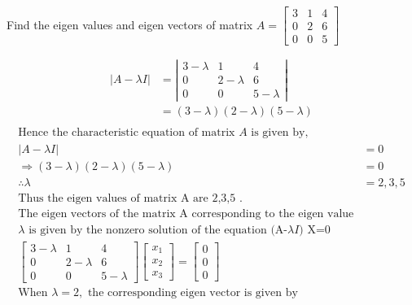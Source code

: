 \begin{exercise}
	 Find the eigen values and eigen vectors of matrix $A=\left[\begin{array}{lll}3 & 1 & 4 \\ 0 & 2 & 6 \\ 0 & 0 & 5\end{array}\right]$\end{exercise}
 \begin{answer}
 	\begin{align*}
 		|A-\lambda I|&=\left|\begin{array}{ccc}
 			3-\lambda & 1 & 4 \\
 			0 & 2-\lambda & 6 \\
 			0 & 0 & 5-\lambda
 		\end{array}\right|\\&=(3-\lambda)(2-\lambda)(5-\lambda)\\
 	\end{align*}
 	\begin{align*}
 		\text{Hence the characteristic equation of matrix $A$ is given by},\\
 		|A-\lambda I| &=0 \\\Rightarrow (3-\lambda)(2-\lambda)(5-\lambda)&=0 \\
 		\therefore  \lambda &=2,3,5\\
 		\text{Thus the eigen values of matrix A are 2,3,5 .}
 		\\\text{The eigen vectors of the matrix A corresponding to the eigen value}\\\text{$\lambda$ is given by the nonzero solution of the equation (A-$\lambda I)$ X=0}\\
 		\left[\begin{array}{lll}
 			3-\lambda & 1 & 4 \\
 			0 & 2-\lambda & 6 \\
 			0 & 0 & 5-\lambda
 		\end{array}\right]\left[\begin{array}{l}
 			x_{1} \\
 			x_{2} \\
 			x_{3}
 		\end{array}\right]=\left[\begin{array}{l}
 			0 \\
 			0 \\
 			0
 		\end{array}\right]\\
 		\text{When $\lambda=2,$ the corresponding eigen vector is given by}\\

\end{align*}
\end{answer}
